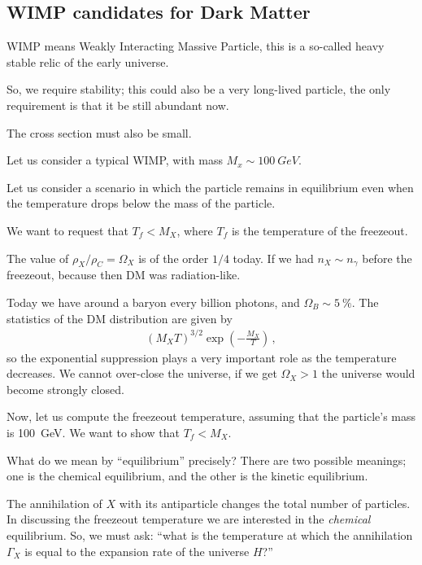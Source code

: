 \documentclass[main.tex]{subfiles}
\begin{document}
\subsection{WIMP candidates for Dark Matter}


WIMP means Weakly Interacting Massive Particle, this is a so-called heavy stable relic of the early universe. 

So, we require stability; this could also be a very long-lived particle, the only requirement is that it be still abundant now. 

The cross section must also be small. 

Let us consider a typical WIMP, with mass \(M_x \sim \SI{100}{GeV}\).

Let us consider a scenario in which the particle remains in equilibrium even when the temperature drops below the mass of the particle. 

We want to request that \(T_f< M_X\), where \(T_f\) is the temperature of the freezeout.

The value of \(\rho_{X} / \rho_{C} = \Omega_{X}\) is of the order \(1/4\) today. If we had \(n_X \sim n_\gamma \) before the freezeout, because then DM was radiation-like. 

Today we have around a baryon every billion photons, and \(\Omega_{B} \sim \SI{5}{\percent}\). 
The statistics of the DM distribution are given by 
%
\begin{align}
(M_X T)^{3/2} \exp(- \frac{M_X}{T})
\,,
\end{align}
%
so the exponential suppression plays a very important role as the temperature decreases.
We cannot over-close the universe, if we get \(\Omega_{X}> 1\) the universe would become strongly closed. 

Now, let us compute the freezeout temperature, assuming that the particle's mass is \SI{100}{GeV}. We want to show that \(T_f < M_X\).

What do we mean by ``equilibrium'' precisely? There are two possible meanings; one is the chemical equilibrium, and the other is the kinetic equilibrium. 

The annihilation of \(X\) with its antiparticle changes the total number of particles. 
In discussing the freezeout temperature we are interested in the \emph{chemical} equilibrium. 
So, we must ask: ``what is the temperature at which the annihilation \(\Gamma_{X}\) is equal to the expansion rate of the universe \(H\)?''
\end{document}
